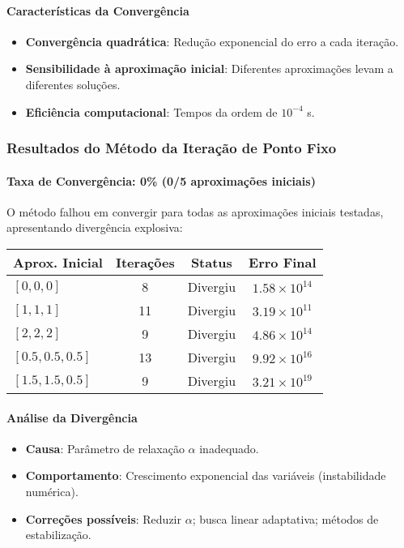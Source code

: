 \documentclass[12pt,a4paper]{article}
\begin{document}
\paragraph{Características da Convergência}
\begin{itemize}
    \item \textbf{Convergência quadrática}: Redução exponencial do erro a cada iteração.
    \item \textbf{Sensibilidade à aproximação inicial}: Diferentes aproximações levam a diferentes soluções.
    \item \textbf{Eficiência computacional}: Tempos da ordem de $10^{-4}$ s.
\end{itemize}

\subsubsection{Resultados do Método da Iteração de Ponto Fixo}
\paragraph{Taxa de Convergência: 0\% (0/5 aproximações iniciais)}
O método falhou em convergir para todas as aproximações iniciais testadas, apresentando divergência explosiva:
\begin{table}[H]
\centering
\begin{tabular}{lccc}
\hline
\textbf{Aprox. Inicial} & \textbf{Iterações} & \textbf{Status} & \textbf{Erro Final} \\
\hline
$[0,0,0]$ & 8  & Divergiu & $1.58\times 10^{14}$ \\
$[1,1,1]$ & 11 & Divergiu & $3.19\times 10^{11}$ \\
$[2,2,2]$ & 9  & Divergiu & $4.86\times 10^{14}$ \\
$[0.5,0.5,0.5]$ & 13 & Divergiu & $9.92\times 10^{16}$ \\
$[1.5,1.5,0.5]$ & 9 & Divergiu & $3.21\times 10^{19}$ \\
\hline
\end{tabular}
\end{table}

\paragraph{Análise da Divergência}
\begin{itemize}
    \item \textbf{Causa}: Parâmetro de relaxação $\alpha$ inadequado.
    \item \textbf{Comportamento}: Crescimento exponencial das variáveis (instabilidade numérica).
    \item \textbf{Correções possíveis}: Reduzir $\alpha$; busca linear adaptativa; métodos de estabilização.
\end{itemize}
\end{document}
